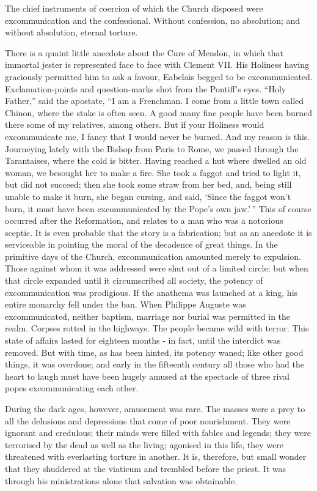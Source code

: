 \documentclass[]{book}
\begin{document}
The chief instruments of coercion of which the Church disposed were
excommunication and the confessional. Without confession, no absolution;
and without absolution, eternal torture.

There is a quaint little anecdote about the Cure of Mendon, in which
that immortal jester is represented face to face with Clement VII. His
Holiness having graciously permitted him to ask a favour, Eabelais
begged to be excommunicated. Exclamation-points and question-marks shot
from the Pontiff's eyes. ``Holy Father,'' said the apostate, ``I am a
Frenchman. I come from a little town called Chinon, where the stake is
often seen. A good many fine people have been burned there some of my
relatives, among others. But if your Holiness would excommunicate me, I
fancy that I would never be burned. And my reason is this. Journeying
lately with the Bishop from Paris to Rome, we passed through the
Tarantaises, where the cold is bitter. Having reached a hut where
dwelled an old woman, we besought her to make a fire. She took a faggot
and tried to light it, but did not succeed; then she took some straw
from her bed, and, being still unable to make it burn, she began
cursing, and said, `Since the faggot won't burn, it must have been
excommunicated by the Pope's own jaw.'\,'' This of course occurred after
the Reformation, and relates to a man who was a notorious sceptic. It is
even probable that the story is a fabrication; but as an anecdote it is
serviceable in pointing the moral of the decadence of great things. In
the primitive days of the Church, excommunication amounted merely to
expulsion. Those against whom it was addressed were shut out of a
limited circle; but when that circle expanded until it circumscribed all
society, the potency of excommunication was prodigious. If the anathema
was launched at a king, his entire monarchy fell under the ban. When
Philippe Auguste was excommunicated, neither baptism, marriage nor
burial was permitted in the realm. Corpses rotted in the highways. The
people became wild with terror. This state of affairs lasted for
eighteen months - in fact, until the interdict was removed. But with
time, as has been hinted, its potency waned; like other good things, it
was overdone; and early in the fifteenth century all those who had the
heart to laugh must have been hugely amused at the spectacle of three
rival popes excommunicating each other.

During the dark ages, however, amusement was rare. The masses were a
prey to all the delusions and depressions that come of poor nourishment.
They were ignorant and credulous; their minds were filled with fables
and legends; they were terrorised by the dead as well as the living;
agonised in this life, they were threatened with everlasting torture in
another. It is, therefore, but small wonder that they shuddered at the
viaticum and trembled before the priest. It was through his
ministrations alone that salvation was obtainable.
\end{document}
